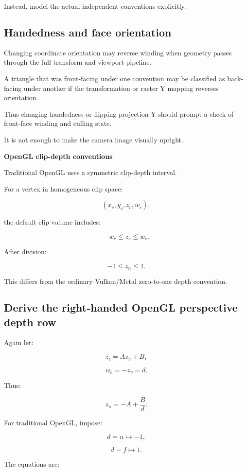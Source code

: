 Instead, model the actual independent conventions explicitly.

\subsection{Handedness and face orientation}\label{02-foundations-ii-ch033-handedness-and-face-orientation}

Changing coordinate orientation may reverse winding when geometry passes through the full transform and viewport pipeline.

A triangle that was front-facing under one convention may be classified as back-facing under another if the transformation or raster Y mapping reverses orientation.

Thus changing handedness or flipping projection Y should prompt a check of front-face winding and culling state.

It is not enough to make the camera image visually upright.

\textbf{OpenGL clip-depth conventions}

Traditional OpenGL uses a symmetric clip-depth interval.

For a vertex in homogeneous clip space:

\[
 (x_c,y_c,z_c,w_c),
\]

the default clip volume includes:

\[
 \boxed{-w_c\le z_c\le w_c}.
\]

After division:

\[
 \boxed{-1\le z_n\le1}.
\]

This differs from the ordinary Vulkan/Metal zero-to-one depth convention.

\subsection{Derive the right-handed OpenGL perspective depth row}\label{02-foundations-ii-ch033-derive-the-right-handed-opengl-perspective-depth-row}

Again let:

\[
 z_c=Az_v+B,
\]

\[
 w_c=-z_v=d.
\]

Thus:

\[
 z_n=-A+\frac Bd.
\]

For traditional OpenGL, impose:

\[
 d=n\mapsto-1,
\]

\[
 d=f\mapsto1.
\]

The equations are:

